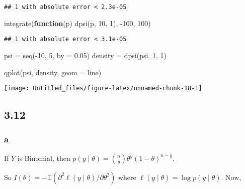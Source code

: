 \documentclass[
]{article}
\newenvironment{Shaded}{\begin{snugshade}}{\end{snugshade}}
\newcommand{\AttributeTok}[1]{\textcolor[rgb]{0.77,0.63,0.00}{#1}}
\newcommand{\ControlFlowTok}[1]{\textcolor[rgb]{0.13,0.29,0.53}{\textbf{#1}}}
\newcommand{\DecValTok}[1]{\textcolor[rgb]{0.00,0.00,0.81}{#1}}
\newcommand{\FloatTok}[1]{\textcolor[rgb]{0.00,0.00,0.81}{#1}}
\newcommand{\FunctionTok}[1]{\textcolor[rgb]{0.00,0.00,0.00}{#1}}
\newcommand{\NormalTok}[1]{#1}
\newcommand{\OtherTok}[1]{\textcolor[rgb]{0.56,0.35,0.01}{#1}}
\newcommand{\SpecialCharTok}[1]{\textcolor[rgb]{0.00,0.00,0.00}{#1}}
\newcommand{\StringTok}[1]{\textcolor[rgb]{0.31,0.60,0.02}{#1}}
\begin{document}
\begin{verbatim}
## 1 with absolute error < 2.3e-05
\end{verbatim}

\begin{Shaded}
\begin{Highlighting}[]
\FunctionTok{integrate}\NormalTok{(}\ControlFlowTok{function}\NormalTok{(p) }\FunctionTok{dpsi}\NormalTok{(p, }\DecValTok{10}\NormalTok{, }\DecValTok{1}\NormalTok{), }\SpecialCharTok{{-}}\DecValTok{100}\NormalTok{, }\DecValTok{100}\NormalTok{)}
\end{Highlighting}
\end{Shaded}

\begin{verbatim}
## 1 with absolute error < 3.1e-05
\end{verbatim}

\begin{Shaded}
\begin{Highlighting}[]
\NormalTok{psi }\OtherTok{=} \FunctionTok{seq}\NormalTok{(}\SpecialCharTok{{-}}\DecValTok{10}\NormalTok{, }\DecValTok{5}\NormalTok{, }\AttributeTok{by =} \FloatTok{0.05}\NormalTok{)}
\NormalTok{density }\OtherTok{=} \FunctionTok{dpsi}\NormalTok{(psi, }\DecValTok{1}\NormalTok{, }\DecValTok{1}\NormalTok{)}

\FunctionTok{qplot}\NormalTok{(psi, density, }\AttributeTok{geom =} \StringTok{\textquotesingle{}line\textquotesingle{}}\NormalTok{)}
\end{Highlighting}
\end{Shaded}

\begin{center}\texttt{[image: Untitled\_files/figure-latex/unnamed-chunk-18-1]} \end{center}

\hypertarget{section-7}{%
\subsection{3.12}\label{section-7}}

\hypertarget{a-6}{%
\subsubsection{a}\label{a-6}}

If \(Y\) is Binomial, then
\(p(y \mid \theta) = {n \choose y} \theta^y (1 - \theta)^{n - y}\).

So
\(I(\theta) = -\mathbb{E}(\partial^2 \ell(y \mid \theta) / \partial \theta^2 )\)
where \(\ell(y \mid \theta) = \log p(y \mid \theta)\). Now,
\end{document}
